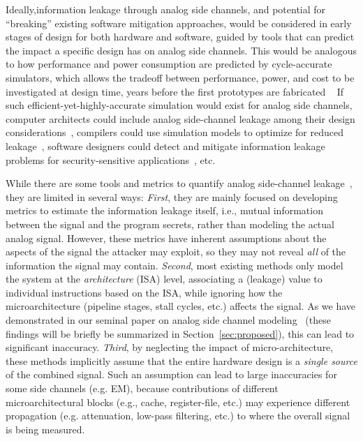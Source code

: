 \documentclass[11 pt]{article}
\begin{document}
Ideally,information leakage through analog side channels, and potential for ``breaking'' existing software mitigation approaches, would be considered in early stages of design for both hardware and software, guided by tools that can predict the impact a specific design has on analog side channels. This would be analogous to how performance and power consumption are predicted by cycle-accurate simulators, which allows the tradeoff between performance, power, and cost to be investigated at design time, years before the first prototypes are fabricated ~\cite{Li:2009:MIP:1669112.1669172,Li:2011:CAM:2132325.2132479,509850,Ardestani:2013:EFM:2495252.2495480,Binkert:2011:GS:2024716.2024718,sesc,5982026,carlson2014aeohmcm} If such efficient-yet-highly-accurate simulation would exist for analog side channels, computer architects could include analog side-channel leakage among their design considerations~\cite{8416860,Althoff:2018:HII:3276539.3276601,Andrysco:2018:TVC:3243734.3243766,cryptoeprint:2018:808,Rane:2016:SPF:3241094.3241101,nayak2017hop}, compilers could use simulation models to optimize for reduced leakage~\cite{Liu:2015:GHS:2694344.2694385,Rane:2015:RCD:2831143.2831171,Gorman:2017:AON:3123939.3123973}, software designers could detect and mitigate information leakage problems for security-sensitive applications~\cite{Wichelmann:2018:MFF:3274694.3274741,Chen:2017:PDS:3133956.3134058,Wu:2018:ETS:3213846.3213851}, etc.

While there are some tools and metrics to quantify analog side-channel leakage~\cite{Demme:2013:FOM:2485922.2485970,Callan:2014:PMM:2742155.2742179,McCann:2017:TPT:3241189.3241207,Barenghi:2018:SSS:3195970.3196112, yilmaz17tifs}, they are limited in several ways: \textit{First}, they are mainly focused on developing metrics to estimate the information leakage itself, i.e., mutual information between the signal and the program secrets, rather than modeling the actual analog signal. However, these metrics have inherent assumptions about the aspects of the signal the attacker may exploit, so they may not reveal \emph{all} of the information the signal may contain. \textit{Second}, most existing methods only model the system at the \textit{architecture} (ISA) level, associating a (leakage) value to individual instructions based on the ISA, while ignoring how the microarchitecture (pipeline stages, stall cycles, etc.) affects the signal. As we have demonstrated in our seminal paper on analog side channel modeling~\cite{Nader2020} (these findings will be briefly be summarized in Section~\ref{sec:proposed}), this can lead to significant inaccuracy. \textit{Third}, by neglecting the impact of micro-architecture, these methods implicitly assume that the entire hardware design is a \textit{single source} of the combined signal. Such an assumption can lead to large inaccuracies for some side channels (e.g. EM), because contributions of different microarchitectural blocks (e.g., cache, register-file, etc.) may experience different propagation (e.g. attenuation, low-pass filtering, etc.) to where the overall signal is being measured.
\end{document}
